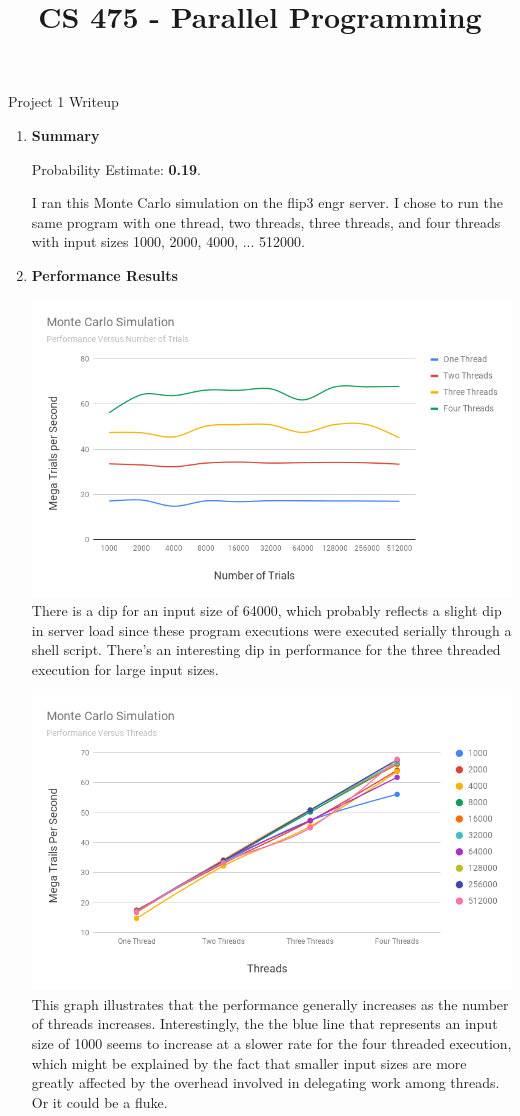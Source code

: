 \documentclass[11pt,letterpaper]{article}
\begin{document}
 \univlogo

\title{CS 475 - Parallel Programming}
{\Huge Project 1 Writeup}\\[5mm]

\begin{enumerate}
  \item \textbf{Summary} 
      
      Probability Estimate: \textbf{0.19}.

      I ran this Monte Carlo simulation on the flip3 engr server. 
      I chose to run the same
      program with one thread, two threads, three threads, and four threads
      with input sizes 1000, 2000, 4000, ... 512000. 

  \item \textbf{Performance Results} 
    
    \includegraphics[width=\linewidth]{versusTrials.png}
      There is a dip for an input size of 64000,
      which probably reflects a slight dip in
      server load since these program executions
      were executed serially through a shell 
      script. There's an interesting dip in
      performance for the three threaded execution
      for large input sizes. 

    
    \includegraphics[width=\linewidth]{versusThreads.png}
    This graph illustrates that the performance 
    generally increases as the number of threads
    increases. Interestingly, the the blue line
    that represents an input size of 1000 seems
    to increase at a slower rate for the four
    threaded execution, which might be explained
    by the fact that smaller input sizes are more
    greatly affected by the overhead involved
    in delegating work among threads. Or it could
    be a fluke. 


\end{enumerate}
\end{document}
